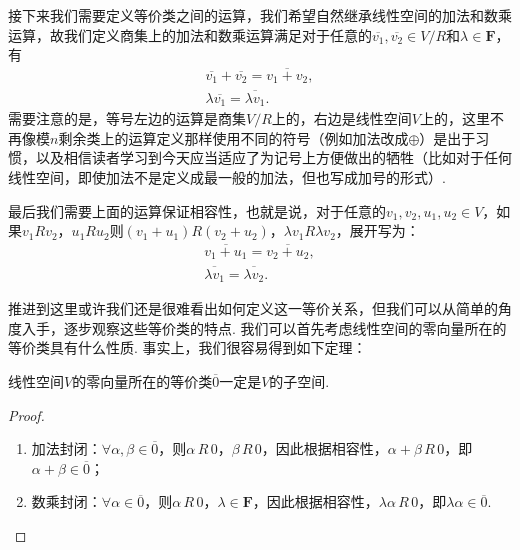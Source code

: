 接下来我们需要定义等价类之间的运算，我们希望自然继承线性空间的加法和数乘运算，故我们定义商集上的加法和数乘运算满足对于任意的$\overline{v_1},\overline{v_2}\in V/R$和$\lambda\in\mathbf{F}$，有
\begin{equation} \label{eq:10:商集运算}
    \begin{gathered}
        \overline{v_1}+\overline{v_2}=\overline{v_1+v_2},\\
        \lambda\overline{v_1}=\overline{\lambda v_1}.
    \end{gathered}
\end{equation}
需要注意的是，等号左边的运算是商集$V/R$上的，右边是线性空间$V$上的，这里不再像模$n$剩余类上的运算定义那样使用不同的符号（例如加法改成$\oplus$）是出于习惯，以及相信读者学习到今天应当适应了为记号上方便做出的牺牲（比如对于任何线性空间，即使加法不是定义成最一般的加法，但也写成加号的形式）.

最后我们需要上面的运算保证相容性，也就是说，对于任意的$v_1,v_2,u_1,u_2\in V$，如果$v_1Rv_2$，$u_1Ru_2$则$(v_1+u_1)R(v_2+u_2)$，$\lambda v_1R\lambda v_2$，展开写为：
\begin{gather*}
    \overline{v_1+u_1}=\overline{v_2+u_2},\\
    \overline{\lambda v_1}=\overline{\lambda v_2}.
\end{gather*}

推进到这里或许我们还是很难看出如何定义这一等价关系，但我们可以从简单的角度入手，逐步观察这些等价类的特点. 我们可以首先考虑线性空间的零向量所在的等价类具有什么性质. 事实上，我们很容易得到如下定理：
\begin{theorem}{}{}
    线性空间$V$的零向量所在的等价类$\overline{0}$一定是$V$的子空间.
\end{theorem}
\begin{proof}
    \begin{enumerate}
        \item 加法封闭：$\forall \alpha,\beta\in\overline{0}$，则$\alpha\,R\,0$，$\beta\,R\,0$，因此根据相容性，$\alpha+\beta\,R\,0$，即$\alpha+\beta\in\overline{0}$；
        \item 数乘封闭：$\forall \alpha\in\overline{0}$，则$\alpha\,R\,0$，$\lambda\in\mathbf{F}$，因此根据相容性，$\lambda\alpha\,R\,0$，即$\lambda\alpha\in\overline{0}$.
    \end{enumerate}
\end{proof}


